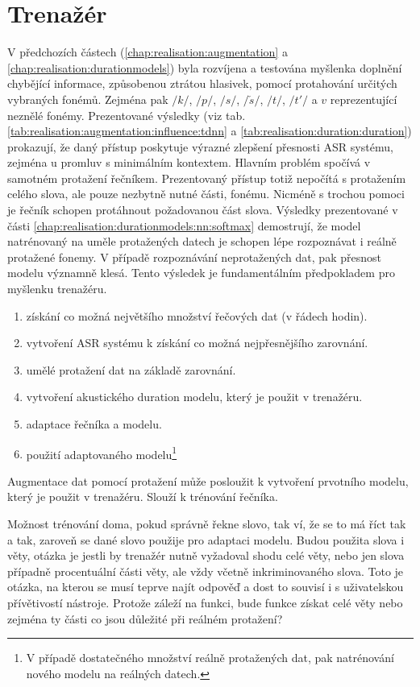 \section{Trenažér}
\label{chap:realisation:trainer}

V předchozích částech (\ref{chap:realisation:augmentation} a \ref{chap:realisation:durationmodels}) byla rozvíjena a testována myšlenka doplnění chybějící informace, způsobenou ztrátou hlasivek, pomocí protahování určitých vybraných fonémů. Zejména pak $/k/$, $/p/$, $/s/$, $/\check{s}/$, $/t/$, $/t'/$ a $v$ reprezentující neznělé fonémy. Prezentované výsledky (viz tab. \ref{tab:realisation:augmentation:influence:tdnn} a \ref{tab:realisation:duration:duration}) prokazují, že daný přístup poskytuje výrazné zlepšení přesnosti ASR systému, zejména u promluv s minimálním kontextem. Hlavním problém spočívá v samotném protažení řečníkem. Prezentovaný přístup totiž nepočítá s protažením celého slova, ale pouze nezbytně nutné části, fonému. Nicméně s trochou pomoci je řečník schopen protáhnout požadovanou část slova. Výsledky prezentované v části \ref{chap:realisation:durationmodels:nn:softmax} demostrují, že model natrénovaný na uměle protažených datech je schopen lépe rozpoznávat i reálně protažené fonemy. V případě rozpoznávání neprotažených dat, pak přesnost modelu významně klesá. Tento výsledek je fundamentálním předpokladem pro myšlenku trenažéru.

\begin{enumerate}
  \item získání co možná největšího množství řečových dat (v řádech hodin).
  \item vytvoření ASR systému k získání co možná nejpřesnějšího zarovnání.
  \item umělé protažení dat na základě zarovnání.
  \item vytvoření akustického duration modelu, který je použit v trenažéru.
  \item adaptace řečníka a modelu.
  \item použití adaptovaného modelu\footnote{V případě dostatečného množství reálně protažených dat, pak natrénování nového modelu na reálných datech.}
\end{enumerate}



Augmentace dat pomocí protažení může posloužit k vytvoření prvotního modelu, který je použit v trenažéru. Slouží k trénování řečníka.

Možnost trénování doma, pokud správně řekne slovo, tak ví, že se to má říct tak a tak, zaroveň se dané slovo použije pro adaptaci modelu. Budou použita slova i věty, otázka je jestli by trenažér nutně vyžadoval shodu celé věty, nebo jen slova případně procentuální části věty, ale vždy včetně inkriminovaného slova. Toto je otázka, na kterou se musí teprve najít odpověď a dost to souvisí i s uživatelskou přívětivostí nástroje. Protože záleží na funkci, bude funkce získat celé věty nebo zejména ty části co jsou důležité při reálném protažení?
